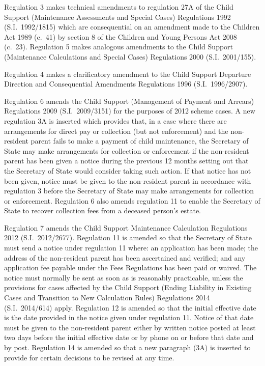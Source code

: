 \documentclass[12pt,a4paper]{article}
\begin{document}
Regulation 3 makes technical amendments to regulation 27A of the Child Support (Maintenance Assessments and Special Cases) Regulations 1992 (S.I.~1992\slash 1815) which are consequential on an amendment made to the Children Act 1989 (c.~41) by section 8 of the Children and Young Persons Act 2008 (c.~23). Regulation 5 makes analogous amendments to the Child Support (Maintenance Calculations and Special Cases) Regulations 2000 (S.I.~2001/155).

Regulation 4 makes a clarificatory amendment to the Child Support Departure Direction and Consequential Amendments Regulations 1996 (S.I.~1996/2907).

Regulation 6 amends the Child Support (Management of Payment and Arrears) Regulations 2009 (S.I.~2009/3151) for the purposes of 2012 scheme cases. A new regulation 3A is inserted which provides that, in a case where there are arrangements for direct pay or collection (but not enforcement) and the non-resident parent fails to make a payment of child maintenance, the Secretary of State may make arrangements for collection or enforcement if the non-resident parent has been given a notice during the previous 12 months setting out that the Secretary of State would consider taking such action. If that notice has not been given, notice must be given to the non-resident parent in accordance with regulation 3 before the Secretary of State may make arrangements for collection or enforcement. Regulation 6 also amends regulation 11 to enable the Secretary of State to recover collection fees from a deceased person’s estate.

Regulation 7 amends the Child Support Maintenance Calculation Regulations 2012 (S.I.~2012/2677). Regulation 11 is amended so that the Secretary of State must send a notice under regulation 11 where: an application has been made; the address of the non-resident parent has been ascertained and verified; and any application fee payable under the Fees Regulations has been paid or waived. The notice must normally be sent as soon as is reasonably practicable, unless the provisions for cases affected by the Child Support (Ending Liability in Existing Cases and Transition to New Calculation Rules) Regulations 2014 (S.I.~2014/614) apply. Regulation 12 is amended so that the initial effective date is the date provided in the notice given under regulation 11. Notice of that date must be given to the non-resident parent either by written notice posted at least two days before the initial effective date or by phone on or before that date and by post. Regulation 14 is amended so that a new paragraph (3A) is inserted to provide for certain decisions to be revised at any time.
\end{document}
